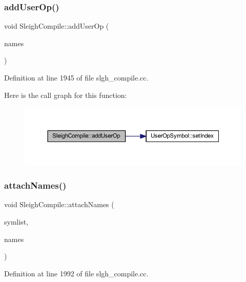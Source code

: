 \subsubsection{\texorpdfstring{addUserOp()}{addUserOp()}}
{\footnotesize\ttfamily void Sleigh\+Compile\+::add\+User\+Op (\begin{DoxyParamCaption}\item[{vector$<$ string $>$ $\ast$}]{names }\end{DoxyParamCaption})}



Definition at line 1945 of file slgh\+\_\+compile.\+cc.

Here is the call graph for this function\+:
\nopagebreak
\begin{figure}[H]
\begin{center}
\leavevmode
\includegraphics[width=350pt]{class_sleigh_compile_ab5e2aa6387dbb75df28a3418665cdd51_cgraph}
\end{center}
\end{figure}
\mbox{\label{class_sleigh_compile_aeb453f70cf88dfa1459a859c5d3ef551}} 
\subsubsection{\texorpdfstring{attachNames()}{attachNames()}}
{\footnotesize\ttfamily void Sleigh\+Compile\+::attach\+Names (\begin{DoxyParamCaption}\item[{vector$<$ \mbox{\hyperlink{class_sleigh_symbol}{Sleigh\+Symbol}} $\ast$ $>$ $\ast$}]{symlist,  }\item[{vector$<$ string $>$ $\ast$}]{names }\end{DoxyParamCaption})}



Definition at line 1992 of file slgh\+\_\+compile.\+cc.

